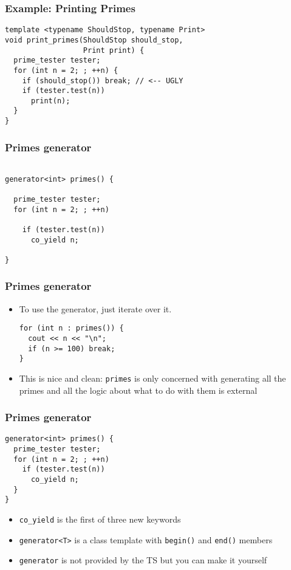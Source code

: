\documentclass[aspectratio=43]{beamer}
\begin{document}
\begin{frame}
  \frametitle{Example: Printing Primes}
  \begin{lstlisting}
template <typename ShouldStop, typename Print>
void print_primes(ShouldStop should_stop,
                  Print print) {
  prime_tester tester;
  for (int n = 2; ; ++n) {
    if (should_stop()) break; // <-- UGLY
    if (tester.test(n))
      print(n);
  }
}
\end{lstlisting}
\end{frame}
\begin{frame}[fragile]
  \frametitle{Primes generator}
  \begin{lstlisting}

generator<int> primes() {

  prime_tester tester;
  for (int n = 2; ; ++n)

    if (tester.test(n))
      co_yield n;

}
\end{lstlisting}
\end{frame}

\begin{frame}[fragile]
  \frametitle{Primes generator}
  \begin{itemize}
  \item To use the generator, just iterate over it.
\begin{lstlisting}
for (int n : primes()) {
  cout << n << "\n";
  if (n >= 100) break;
}
\end{lstlisting}
  \item This is nice and clean: \lstinline~primes~ is only concerned with generating
    all the primes and all the logic about what to do with them is external
  \end{itemize}
\end{frame}

\begin{frame}[fragile]
  \frametitle{Primes generator}
\begin{lstlisting}
generator<int> primes() {
  prime_tester tester;
  for (int n = 2; ; ++n)
    if (tester.test(n))
      co_yield n;
  }
}
\end{lstlisting}
  \begin{itemize}
  \item \lstinline~co_yield~ is the first of three new keywords
  \item \lstinline~generator<T>~ is a class template with \lstinline~begin()~
    and \lstinline~end()~ members
  \item \lstinline~generator~ is not provided by the TS but you can make it
    yourself
  \end{itemize}
\end{frame}
\end{document}
